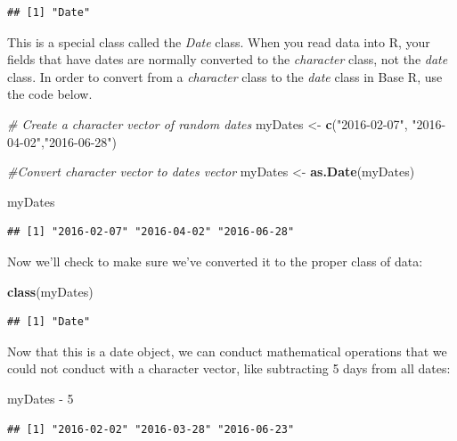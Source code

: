 \documentclass[]{book}
\newenvironment{Shaded}{\begin{snugshade}}{\end{snugshade}}
\newcommand{\KeywordTok}[1]{\textcolor[rgb]{0.13,0.29,0.53}{\textbf{{#1}}}}
\newcommand{\DecValTok}[1]{\textcolor[rgb]{0.00,0.00,0.81}{{#1}}}
\newcommand{\StringTok}[1]{\textcolor[rgb]{0.31,0.60,0.02}{{#1}}}
\newcommand{\CommentTok}[1]{\textcolor[rgb]{0.56,0.35,0.01}{\textit{{#1}}}}
\newcommand{\NormalTok}[1]{{#1}}
\begin{document}
\begin{verbatim}
## [1] "Date"
\end{verbatim}

This is a special class called the \emph{Date} class. When you read data
into R, your fields that have dates are normally converted to the
\emph{character} class, not the \emph{date} class. In order to convert
from a \emph{character} class to the \emph{date} class in Base R, use
the code below.

\begin{Shaded}
\begin{Highlighting}[]
\CommentTok{# Create a character vector of random dates}
\NormalTok{myDates <-}\StringTok{ }\KeywordTok{c}\NormalTok{(}\StringTok{"2016-02-07"}\NormalTok{, }\StringTok{"2016-04-02"}\NormalTok{,}\StringTok{"2016-06-28"}\NormalTok{)}

\CommentTok{#Convert character vector to dates vector}
\NormalTok{myDates <-}\StringTok{ }\KeywordTok{as.Date}\NormalTok{(myDates)}

\NormalTok{myDates}
\end{Highlighting}
\end{Shaded}

\begin{verbatim}
## [1] "2016-02-07" "2016-04-02" "2016-06-28"
\end{verbatim}

Now we'll check to make sure we've converted it to the proper class of
data:

\begin{Shaded}
\begin{Highlighting}[]
\KeywordTok{class}\NormalTok{(myDates)}
\end{Highlighting}
\end{Shaded}

\begin{verbatim}
## [1] "Date"
\end{verbatim}

Now that this is a date object, we can conduct mathematical operations
that we could not conduct with a character vector, like subtracting 5
days from all dates:

\begin{Shaded}
\begin{Highlighting}[]
\NormalTok{myDates -}\StringTok{ }\DecValTok{5}
\end{Highlighting}
\end{Shaded}

\begin{verbatim}
## [1] "2016-02-02" "2016-03-28" "2016-06-23"
\end{verbatim}
\end{document}
